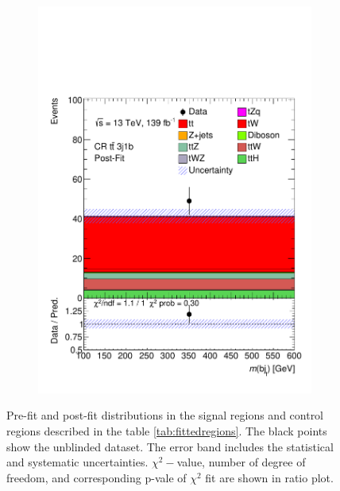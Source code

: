 \begin{figure}[!h]
\begin{subfigure}[b]{0.33\linewidth}
    \includegraphics[width=\textwidth]{ubonn-thesis/Chapters/Chapters_07/Figure/Data/CR_3j1b_postFit.pdf} 
   \caption{}
  \end{subfigure}%
  \caption{Pre-fit and post-fit distributions in the signal regions and control regions described in the table \ref{tab:fittedregions}. The black points show the unblinded dataset. The error band includes the statistical and systematic uncertainties. $\chi^{2}-$value, number of degree of freedom, and corresponding p-vale of $\chi^{2}$ fit are shown in ratio plot.}
  \label{fig:datafit2}
  \end{figure}


